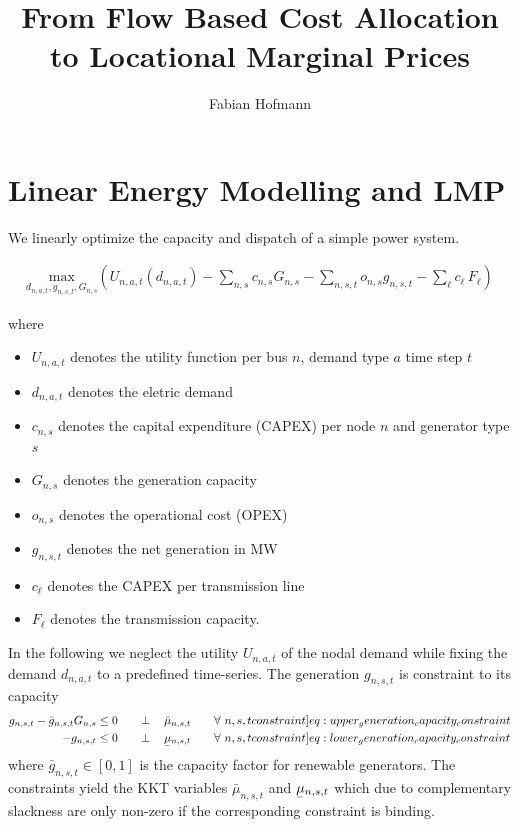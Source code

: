 \documentclass[11pt]{article}
\newcommand{\ubar}[1]{\underaccent{\bar}{#1}}
\newcommand{\generation}{g_{n,s,t}}
\newcommand{\generationpotential}{\bar{g}_{n,s,t}}
\newcommand{\capacityGeneration}{G_{n,s}}
\newcommand{\capacityFlow}{F_{\ell}}
\newcommand{\capexGeneration}{c_{n,s}}
\newcommand{\capexFlow}{c_{\ell}}
\newcommand{\opexGeneration}{o_{n,s}}
\newcommand{\demand}[1][n]{d_{#1,a,t}}
\newcommand{\utility}{U_{n,a,t}}
\newcommand{\mulowergeneration}{\ubar{\mu}_{n,s,t}}
\newcommand{\muuppergeneration}{\bar{\mu}_{n,s,t}}
\newcommand{\resultsin}[1]{\hspace{20pt} \bot  \hspace{12pt} #1}
\newcommand{\Forall}[1]{\hspace{20pt} \forall \,\, #1}
\begin{document}
\title{From Flow Based Cost Allocation to Locational Marginal Prices}
\author{Fabian Hofmann}

\maketitle



\section*{Linear Energy Modelling and LMP}
We linearly optimize the capacity and dispatch of a simple power system. 

\begin{align}
    \underset{\demand, \generation, \capacityGeneration}{\text{max}}
    \left(\utility(\demand) - \sum_{n,s} \capexGeneration \capacityGeneration - \sum_{n, s, t} \opexGeneration \generation - \sum_{\ell} \capexFlow \, \capacityFlow \right) \label{eq:minisation}
\end{align}

where 
\begin{itemize}
\item[] $\utility$ denotes the utility function per bus $n$, demand type $a$ time step $t$ 
 \item[] $\demand$ denotes the eletric demand 
 \item[] $\capexGeneration$ denotes the capital expenditure (CAPEX) per node $n$ and generator type $s$
 \item[] $\capacityGeneration$ denotes the generation capacity
 \item[] $\opexGeneration$ denotes the operational cost (OPEX)
 \item[] $\generation$ denotes the net generation in MW
 \item[] $\capexFlow$ denotes the CAPEX per transmission line 
 \item[] $\capacityFlow$ denotes the transmission capacity.
\end{itemize}

\noindent
In the following we neglect the utility $\utility$ of the nodal demand while fixing the demand $\demand$ to a predefined time-series. The generation $\generation$ is constraint to its capacity
\begin{align}
 \generation - \generationpotential \capacityGeneration  &\le 0 \resultsin{\muuppergeneration}\Forall{n,s,t} 
 \label[constraint]{eq:upper_generation_capacity_constraint}\\ 
 - \generation &\le 0 \resultsin{\mulowergeneration} \Forall{n,s,t} 
 \label[constraint]{eq:lower_generation_capacity_constraint}
 \end{align}
where $\generationpotential \in \left[ 0,1\right]$ is the capacity factor for renewable generators. The constraints yield the KKT variables $\muuppergeneration$ and $\mulowergeneration$ which due to complementary slackness are only non-zero if the corresponding constraint is binding. 
\end{document}

